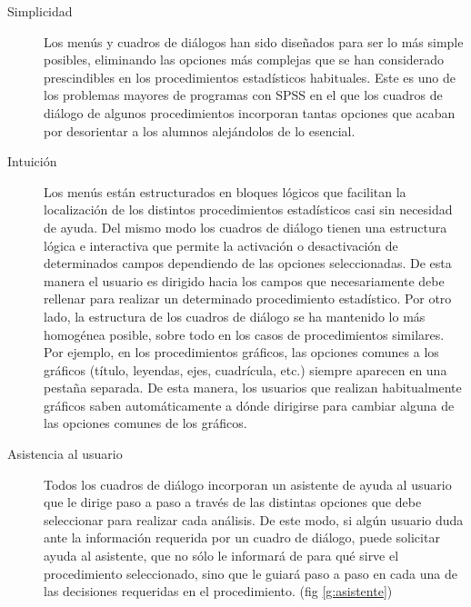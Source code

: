 \documentclass[10pt,twoside,spanish]{article}
\numberwithin{equation}{section}
\begin{document}
\begin{description}
\item[Simplicidad] Los menús y cuadros de diálogos han sido diseñados para ser lo más simple posibles, eliminando las opciones
más complejas que se han considerado prescindibles en los procedimientos estadísticos habituales. 
Este es uno de los problemas mayores de programas con SPSS en el que los cuadros de diálogo de algunos procedimientos incorporan tantas
opciones que acaban por desorientar a los alumnos alejándolos de lo esencial.

\item[Intuición] Los menús están estructurados en bloques lógicos que facilitan la localización de los distintos procedimientos estadísticos
casi sin necesidad de ayuda. Del mismo modo los cuadros de diálogo tienen una estructura lógica e interactiva que permite la activación o
desactivación de determinados campos dependiendo de las opciones seleccionadas. 
De esta manera el usuario es dirigido hacia los campos que necesariamente debe rellenar para realizar un determinado procedimiento
estadístico.
Por otro lado, la estructura de los cuadros de diálogo se ha mantenido lo más homogénea posible, sobre todo en los casos de
procedimientos similares.
Por ejemplo, en los procedimientos gráficos, las opciones comunes a los gráficos (título, leyendas, ejes, cuadrícula, etc.) siempre aparecen
en una pestaña separada.
De esta manera, los usuarios que realizan habitualmente gráficos saben automáticamente a dónde dirigirse para cambiar alguna de las
opciones comunes de los gráficos.

\item[Asistencia al usuario] Todos los cuadros de diálogo incorporan un asistente de ayuda al usuario que le dirige paso a paso a través de
las distintas opciones que debe seleccionar para realizar cada análisis.
De este modo, si algún usuario duda ante la información requerida por un cuadro de diálogo, puede solicitar ayuda al asistente, que no sólo
le informará de para qué sirve el procedimiento seleccionado, sino que le guiará paso a paso en cada una de las decisiones requeridas en el
procedimiento. (fig \ref{g:asistente})


\end{description}
\end{document}

